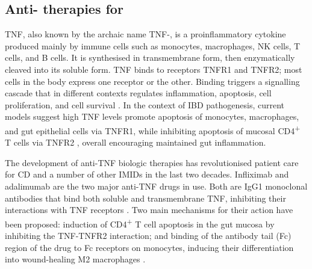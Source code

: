 \subsection{Anti- therapies for }

\Gls{TNF}, also known by the archaic name \gls{TNF}\nobreakdash-\textalpha, is a proinflammatory cytokine produced mainly by immune cells such as monocytes, macrophages, \gls{NK} cells, T cells, and B cells.
It is synthesised in transmembrane form, then enzymatically cleaved into its soluble form.
\gls{TNF} binds to receptors TNFR1 and TNFR2; most cells in the body express one receptor or the other.
Binding triggers a signalling cascade that in different contexts regulates inflammation, apoptosis, cell proliferation, and cell survival \autocite{aggarwal2003SignallingPathwaysTNF,kalliolias2016TNFBiologyPathogenic,digby-bell2019InterrogatingHostImmunity}.
In the context of \gls{IBD} pathogenesis, 
current models suggest high \gls{TNF} levels promote apoptosis of monocytes, macrophages, and gut epithelial cells via TNFR1, while inhibiting apoptosis of mucosal CD4\textsuperscript{+} T cells via TNFR2 \autocite{levin2016MechanismActionAntiTNF,adegbola2018AntiTNFTherapyCrohn,digby-bell2019InterrogatingHostImmunity},
overall encouraging maintained gut inflammation.

The development of anti-\gls{TNF} biologic therapies has revolutionised patient care for \gls{CD} and a number of other \glspl{IMID} in the last two decades.
Infliximab and adalimumab are the two major anti-\gls{TNF} drugs in use.
Both are IgG1 monoclonal antibodies that bind both soluble and transmembrane \gls{TNF}, inhibiting their interactions with \gls{TNF} receptors \autocite{lichtenstein2013ComprehensiveReviewAntitumor,adegbola2018AntiTNFTherapyCrohn}.
Two main mechanisms for their action have been proposed: induction of CD4\textsuperscript{+} T cell apoptosis in the gut mucosa by inhibiting the \gls{TNF}-TNFR2 interaction; and binding of the antibody tail (Fc) region of the drug to Fc receptors on monocytes, inducing their differentiation into wound-healing M2 macrophages \autocite{levin2016MechanismActionAntiTNF}.

